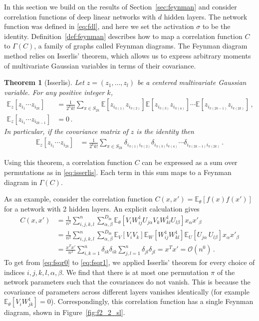 \documentclass[english]{article}
\newtheorem{thm}{Theorem}
\newcommand{\cO}{\ensuremath{\mathcal{O}}}
\newcommand{\Din}{\ensuremath{D_{\mathrm{in}}}}
\newcommand{\lexp}{\mathbb{E}\left[}
\newcommand{\lexpp}[1]{\mathbb{E}_{#1}\left[}
\newcommand{\rexp}{\right]}
\begin{document}
In this section we build on the results of Section~\ref{sec:feynman} and consider correlation functions of deep linear networks with $d$ hidden layers.
The network function was defined in \eqref{eq:fdl}, and here we set the activation $\sigma$ to be the identity.
Definition~\ref{def:feynman} describes how to map a correlation function $C$ to $\Gamma(C)$, a family of graphs called Feynman diagrams.
The Feynman diagram method relies on Isserlis' theorem, which allows us to express arbitrary moments of multivariate Gaussian variables in terms of their covariance.
\begin{thm}[Isserlis] \label{thm:isserlis}
  Let $z=(z_1,\dots,z_l)$ be a centered multivariate Gaussian variable. For any positive integer $k$,
  \begin{align}
    \lexpp{z} z_{i_1} \cdots z_{i_{2k}} \rexp &=
    \frac{1}{2^{k} k!}
    \sum_{\pi \in S_{2k}}
    \lexp z_{i_{\pi(1)}} z_{i_{\pi(2)}} \rexp
    \lexp z_{i_{\pi(3)}} z_{i_{\pi(4)}} \rexp \cdots
    \lexp z_{i_{\pi(2k-1)}} z_{i_{\pi(2k)}} \rexp \,, \label{eq:isserlis}
    \\
    \lexpp{z} z_{i_1} \cdots z_{i_{2k-1}} \rexp &= 0
    \,.
  \end{align}
  In particular, if the covariance matrix of $z$ is the identity then
  \begin{align}
    \lexpp{z} z_{i_1} \cdots z_{i_{2k}} \rexp &=
    \frac{1}{2^{k} k!}
    \sum_{\pi \in S_{2k}}
    \delta_{i_{\pi(1)} i_{\pi(2)}}
    \delta_{i_{\pi(3)} i_{\pi(4)}} \cdots
    \delta_{i_{\pi(2k-1)} i_{\pi(2k)}} \,.
  \end{align}
\end{thm}
Using this theorem, a correlation function $C$ can be expressed as a sum over permutations as in \eqref{eq:isserlis}.
Each term in this sum maps to a Feynman diagram in $\Gamma(C)$.

As an example, consider the correlation function $C(x,x') = \lexpp{\theta} f(x) f(x') \rexp$ for a network with 2 hidden layers.
An explicit calculation gives
\begin{align}
  C(x,x') &= 
  \frac{1}{n^2} \sum_{i,j,k,l}^n \sum_{\alpha,\beta}^{\Din}
  \lexpp{\theta} V_i W^1_{ij} U_{j\alpha} V_{k} W^1_{kl} U_{l\beta} \rexp x_\alpha x'_\beta 
  \label{eq:fsqr0} \\ &=
  \frac{1}{n^2} \sum_{i,j,k,l}^n \sum_{\alpha,\beta}^{\Din}
  \lexpp{V} V_i V_{k} \rexp
  \lexpp{W} W^1_{ij} W^1_{kl} \rexp
  \lexpp{U} U_{j\alpha} \, U_{l\beta} \rexp
  x_\alpha x'_\beta 
  \label{eq:fsqr1} \\
  &= \frac{x^T x'}{n^2} \sum_{i,k=1}^n \delta_{ik} \delta_{ik}
  \sum_{j,l=1}^n \delta_{jl} \delta_{jl} 
  = x^T x' = \cO(n^0) \,. \label{eq:fsqr}
\end{align}
To get from \eqref{eq:fsqr0} to \eqref{eq:fsqr1}, we applied Isserlis' theorem for every choice of indices $i,j,k,l,\alpha,\beta$. 
We find that there is at most one permutation $\pi$ of the network parameters such that the covariances do not vanish.
This is because the covariance of parameters across different layers vanishes identically (for example $\lexpp{\theta}V_iW^1_{jk}\rexp=0$).
Correspondingly, this correlation function has a single Feynman diagram, shown in Figure~\ref{fig:f2_2_sl}.
\end{document}
